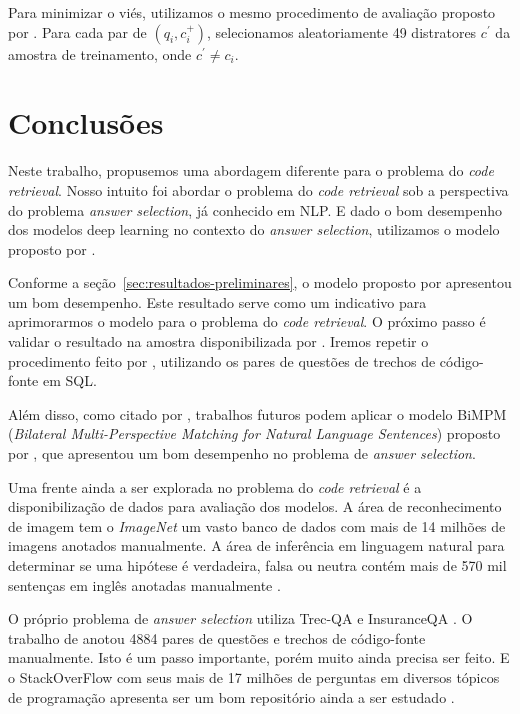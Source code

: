 \documentclass[12pt]{article}
\begin{document}
Para minimizar o viés, utilizamos o mesmo procedimento de avaliação proposto por \cite{iyer-etal-2016-summarizing}. Para cada par de $(q_{i}, c_{i}^{+})$, selecionamos aleatoriamente 49 distratores $c^{'}$ da amostra de treinamento, onde $c^{'} \neq c_{i}$. 

\section{Conclusões}\label{sec:conclusao}

Neste trabalho, propusemos uma abordagem diferente para o problema do \textit{code retrieval}. Nosso intuito foi abordar o problema do \textit{code retrieval} sob a perspectiva do problema \textit{answer selection}, já conhecido em NLP. E dado o bom desempenho dos modelos deep learning no contexto do \textit{answer selection}, utilizamos o modelo proposto por \cite{tan-lstm-qa}.

Conforme a seção~\ref{sec:resultados-preliminares}, o modelo proposto por \cite{tan-lstm-qa} apresentou um bom desempenho. Este resultado serve como um indicativo para aprimorarmos o modelo para o problema do \textit{code retrieval}. O próximo passo é validar o resultado na amostra disponibilizada por \cite{iyer-etal-2016-summarizing}. Iremos repetir o procedimento feito por \cite{Yao-staqc:2018}, utilizando os pares de questões de trechos de código-fonte em SQL.

Além disso, como citado por \cite{lai-etal-2018-review}, trabalhos futuros podem aplicar o modelo BiMPM (\textit{Bilateral Multi-Perspective Matching for Natural Language Sentences}) proposto por \cite{wang-BiMPM-2017}, que apresentou um bom desempenho no problema de \textit{answer selection}.

Uma frente ainda a ser explorada no problema do \textit{code retrieval} é a disponibilização de dados para avaliação dos modelos. A área de reconhecimento de imagem tem o \textit{ImageNet} \cite{imagenet_cvpr09} um vasto banco de dados com mais de 14 milhões de imagens anotados manualmente. A área de inferência em linguagem natural para determinar se uma hipótese é verdadeira, falsa ou neutra contém mais de 570 mil sentenças em inglês anotadas manualmente \cite{snli:emnlp2015}. 

O próprio problema de \textit{answer selection} utiliza Trec-QA \cite{wang-etal-2007-jeopardy} e InsuranceQA \cite{feng-answer-selection-2015}. O trabalho de \cite{Yao-staqc:2018} anotou 4884 pares de questões e trechos de código-fonte manualmente. Isto é um passo importante, porém muito ainda precisa ser feito. E o StackOverFlow com seus mais de 17 milhões de perguntas em diversos tópicos de programação apresenta ser um bom repositório ainda a ser estudado \cite{stackoverflow-survey-2019}.







\end{document}

